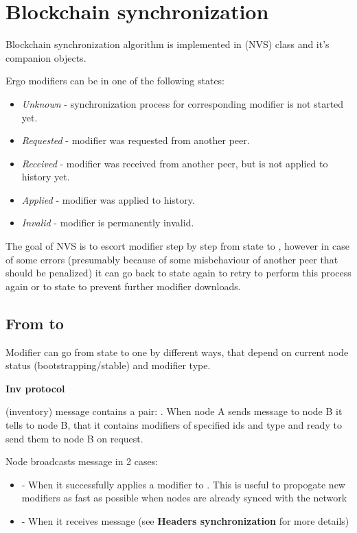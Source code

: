 \section{Blockchain synchronization}

Blockchain synchronization algorithm is implemented in (NVS) class and it's companion objects.


Ergo modifiers can be in one of the following states:

\begin{itemize}
    \item{\em Unknown} - synchronization process for corresponding modifier is not started yet.
    \item{\em Requested} - modifier was requested from another peer.
    \item{\em Received} - modifier was received from another peer, but is not applied to history yet.
    \item{\em Applied} - modifier was applied to history.
    \item{\em Invalid} - modifier is permanently invalid.
\end{itemize}

The goal of NVS is to escort modifier step by step from  state to ,
however in case of some errors (presumably because of some misbehaviour of another
peer that should be penalized) it can go back to  state again to retry to
perform this process again or to  state to prevent further modifier downloads.

\subsection{From  to }

Modifier can go from  state to  one by different ways, that depend on
current node status (bootstrapping/stable) and modifier type.

\textbf{Inv protocol}

 (inventory) message contains a pair: . When node A sends  message
to node B it tells to node B, that it contains modifiers of specified ids and type and ready to send them to
node B on request.

Node broadcasts  message in 2 cases:
\begin{itemize}
    \item - When it successfully applies a modifier to . This is useful to propogate new modifiers
    as fast as possible when nodes are already synced with the network
    \item - When it receives  message (see \textbf{Headers synchronization} for more details)
\end{itemize}

